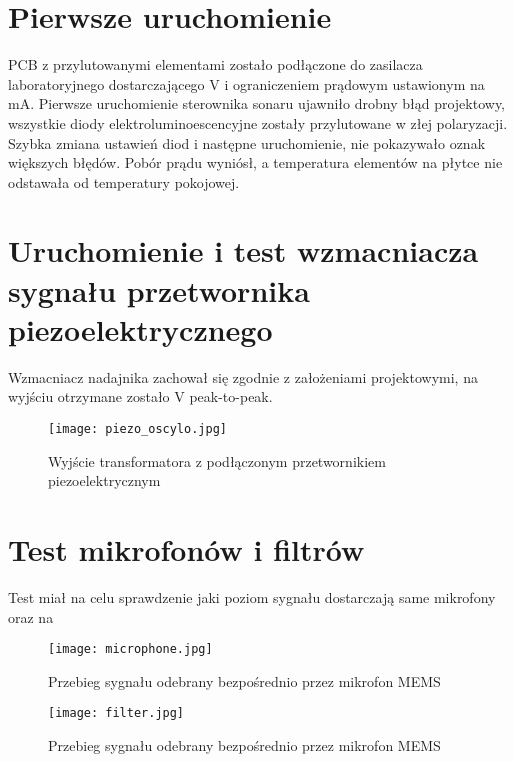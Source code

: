 \section{Pierwsze uruchomienie}
PCB z przylutowanymi elementami zostało podłączone do zasilacza laboratoryjnego dostarczającego \unit[5]{V} i ograniczeniem prądowym ustawionym na \unit[100]{mA}. 
Pierwsze uruchomienie sterownika sonaru ujawniło drobny błąd projektowy, wszystkie diody elektroluminoescencyjne zostały przylutowane w złej polaryzacji.
Szybka zmiana ustawień diod i następne uruchomienie, nie pokazywało oznak większych błędów. Pobór prądu wyniósł, a temperatura elementów na 
płytce nie odstawała od temperatury pokojowej.

\section{Uruchomienie i test wzmacniacza sygnału przetwornika piezoelektrycznego}
Wzmacniacz nadajnika zachował się zgodnie z założeniami projektowymi, na wyjściu otrzymane zostało \unit[80]{V} peak-to-peak. 

\begin{figure}[!ht]
    \centering
    \texttt{[image: piezo\_oscylo.jpg]}
    \caption{Wyjście transformatora z podłączonym przetwornikiem piezoelektrycznym}
    \label{fig:oscylo_piezo3}
\end{figure}

\section{Test mikrofonów i filtrów}
Test miał na celu sprawdzenie jaki poziom sygnału dostarczają same mikrofony oraz na 

\begin{figure}[!ht]
    \centering
    \texttt{[image: microphone.jpg]}
    \caption{Przebieg sygnału odebrany bezpośrednio przez mikrofon MEMS}
    \label{fig:oscylo_piezo4}
\end{figure}

\begin{figure}[!ht]
    \centering
    \texttt{[image: filter.jpg]}
    \caption{Przebieg sygnału odebrany bezpośrednio przez mikrofon MEMS}
    \label{fig:oscylo_piezo4}
\end{figure}
